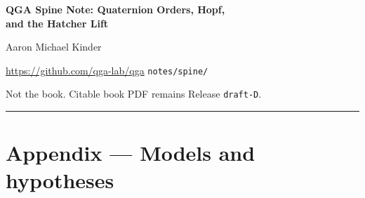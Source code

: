 \documentclass[12pt,a4paper]{article}
\begin{document}
\begin{center}
  {\LARGE\bfseries QGA Spine Note: Quaternion Orders, Hopf,\\[0.25em]
  and the Hatcher Lift\par}
  \vspace{0.8em}
  {\large Aaron Michael Kinder\par}
  \vspace{0.35em}
  {\small\url{https://github.com/qga-lab/qga} \quad\texttt{notes/spine/}\par}
  \vspace{0.5em}
  {\small Not the book. Citable book PDF remains Release \texttt{draft-D}.\par}
\end{center}
\thispagestyle{plain}

\vspace{0.6em}
\noindent\rule{\textwidth}{0.4pt}
\vspace{0.8em}



\clearpage
\section*{Appendix --- Models and hypotheses}
\renewcommand{\thesection}{A.\arabic{section}}
\setcounter{section}{0}

\end{document}
